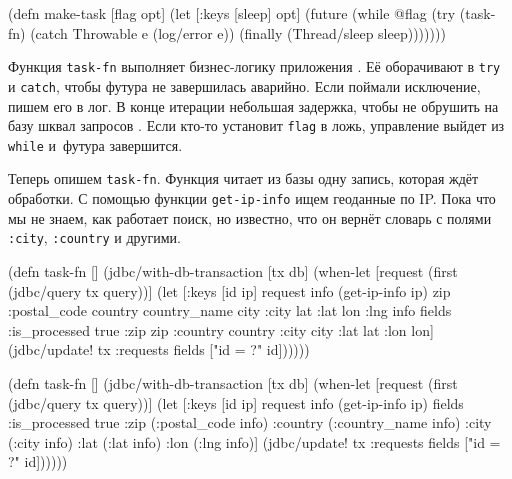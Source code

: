 \else

\begin{english}
  \begin{clojure/lines}
(defn make-task
  [flag opt]
  (let [{:keys [sleep]} opt]
    (future
      (while @flag
        (try
          (task-fn)
          (catch Throwable e
            (log/error e))
          (finally
            (Thread/sleep sleep)))))))
  \end{clojure/lines}
\end{english}

\fi

Функция \verb|task-fn| выполняет бизнес-логику приложения . Её
оборачивают в \verb|try| и \verb|catch|, чтобы футура не завершилась
аварийно. Если поймали исключение, пишем его в лог. В конце итерации небольшая
задержка, чтобы не обрушить на базу шквал запросов . Если кто-то
установит \verb|flag| в ложь, управление выйдет из \verb|while| и~футура
завершится.

Теперь опишем \verb|task-fn|. Функция читает из базы одну запись, которая
ждёт обработки. С помощью функции \verb|get-ip-info| ищем геоданные по
IP. Пока что мы не знаем, как работает поиск, но известно, что он вернёт словарь
с полями \verb|:city|, \verb|:country| и другими.


\ifnarrow

\begin{english}
  \begin{clojure/lines}
(defn task-fn []
 (jdbc/with-db-transaction [tx db]
  (when-let [request
             (first
              (jdbc/query tx query))]
    (let [{:keys [id ip]} request
          info   (get-ip-info ip)
          {zip :postal_code
           country country_name
           city :city lat :lat
           lon :lng} info
          fields {:is_processed true
                  :zip zip
                  :country country
                  :city city
                  :lat lat
                  :lon lon}]
      (jdbc/update! tx :requests
        fields ["id = ?" id])))))
  \end{clojure/lines}
\end{english}

\else

\begin{english}
  \begin{clojure/lines}
(defn task-fn []
  (jdbc/with-db-transaction [tx db]
    (when-let [request (first (jdbc/query tx query))]
      (let [{:keys [id ip]} request
            info   (get-ip-info ip)
            fields {:is_processed true
                    :zip (:postal_code info)
                    :country (:country_name info)
                    :city (:city info)
                    :lat (:lat info)
                    :lon (:lng info)}]
        (jdbc/update! tx :requests
                      fields
                      ["id = ?" id])))))
  \end{clojure/lines}
\end{english}

